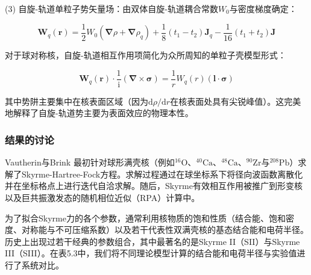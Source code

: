 (3) 自旋-轨道单粒子势矢量场：由双体自旋-轨道耦合常数$W_{0}$与密度梯度确定：

\begin{equation}
\boldsymbol{W}_{q}(\boldsymbol{r})=\frac{1}{2}W_{0}\left(\boldsymbol{\nabla}\rho+\boldsymbol{\nabla}\rho_{q}\right)+\frac{1}{8}\left(t_{1}-t_{2}\right)\boldsymbol{J}_{q}-\frac{1}{16}\left(t_{1}+t_{2}\right)\boldsymbol{J}\label{eq:W_q_spin_orbit}
\end{equation}

对于球对称核，自旋-轨道相互作用项简化为众所周知的单粒子壳模型形式：

\begin{equation}
\boldsymbol{W}_{q}(\boldsymbol{r})\cdot\frac{1}{\mathrm{i}}(\boldsymbol{\nabla}\times\boldsymbol{\sigma})=\frac{1}{r}W_{q}(r)(\boldsymbol{l}\cdot\boldsymbol{\sigma})\label{eq:spin_orbit_spherical}
\end{equation}

其中势阱主要集中在核表面区域（因为$\mathrm{d}\rho/\mathrm{d}r$在核表面处具有尖锐峰值）。这完美地解释了自旋-轨道势主要为表面效应的物理本性。

\subsubsection{结果的讨论\label{subsubsec:=007ED3=00679C=007684=008BA8=008BBA}}

Vautherin与Brink \cite{VB72}最初针对球形满壳核（例如$^{16}\mathrm{O}$、$^{40}\mathrm{Ca}$、$^{48}\mathrm{Ca}$、$^{90}\mathrm{Zr}$与$^{208}\mathrm{Pb}$）求解了Skyrme-Hartree-Fock方程。求解过程通过在球坐标系下将径向波函数离散化并在坐标格点上进行迭代自洽求解。随后，Skyrme有效相互作用被推广到形变核\cite{FQ73}以及巨共振激发态的随机相位近似（RPA）计算中。

为了拟合Skyrme力的各个参数，通常利用核物质的饱和性质（结合能、饱和密度、对称能与不可压缩系数）以及若干代表性双满壳核的基态结合能和电荷半径。历史上出现过若干经典的参数组合，其中最著名的是Skyrme
II（SII）\cite{VB72}与Skyrme III（SIII）\cite{BFG75}。在表5.3中，我们将不同理论模型计算的结合能和电荷半径与实验值进行了系统对比。

